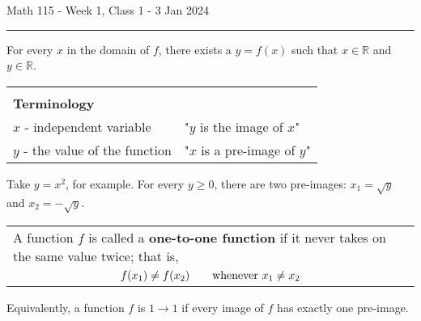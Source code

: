 \documentclass{article}
\begin{document}
Math 115 - Week 1, Class 1 - 3 Jan 2024
\hrule

\begin{center}
\end{center}

For every $x$ in the domain of $f$, there exists a $y=f(x)$ such that $x\in\mathbb{R}$ and $y\in\mathbb{R}$.

\begin{center}
\begin{tabular}{|ll|}
\hline&\\
\multicolumn{2}{|l|}{{\bf{}Terminology}}\\[0.5em]
$x$ - independent variable & "$y$ is the image of $x$"\\[0.5em]
$y$ - the value of the function & "$x$ is a pre-image of $y$"\\[1em]
\hline
\end{tabular}
\end{center}

Take $y=x^2$, for example. For every $y\geq0$, there are two pre-images: $x_1=\sqrt{y}$ and $x_2=-\sqrt{y}$.

\vspace{10pt}

\begin{tabularx}{\textwidth}{|X|}
\cline{1-1}\\
A function $f$ is called a {\bf{}one-to-one function} if it never takes on the same value twice; that is,\\[0.5em]
\multicolumn{1}{|c|}{$f(x_1)\neq f(x_2)\qquad\textnormal{whenever }x_1\neq x_2$}\\[1em]
\cline{1-1}
\end{tabularx}

\vspace{10pt}

Equivalently, a function $f$ is $1\to1$ if every image of $f$ has exactly one pre-image.

\vspace{10pt}
\end{document}

